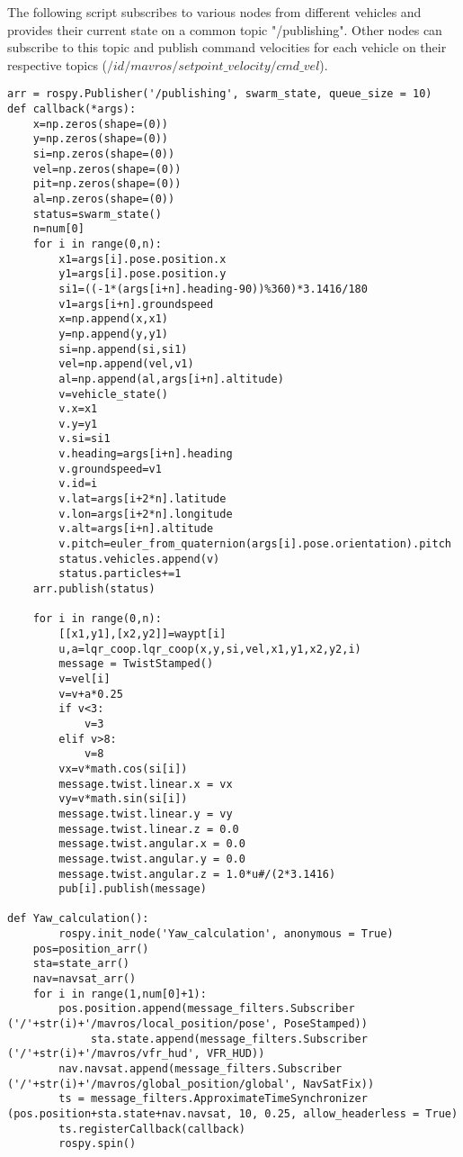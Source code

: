 The following script subscribes to various nodes from different vehicles and provides their current state on a common topic "/publishing". Other nodes can subscribe to this topic and publish command velocities for each vehicle on their respective topics ($/id/mavros/setpoint\_velocity/cmd\_vel$).
\begin{lstlisting}
arr = rospy.Publisher('/publishing', swarm_state, queue_size = 10)
def callback(*args):
	x=np.zeros(shape=(0))
	y=np.zeros(shape=(0))
	si=np.zeros(shape=(0))
	vel=np.zeros(shape=(0))
	pit=np.zeros(shape=(0))
	al=np.zeros(shape=(0))
	status=swarm_state()
	n=num[0]
	for i in range(0,n):	
		x1=args[i].pose.position.x		
		y1=args[i].pose.position.y
		si1=((-1*(args[i+n].heading-90))%360)*3.1416/180
		v1=args[i+n].groundspeed
		x=np.append(x,x1)
		y=np.append(y,y1)
		si=np.append(si,si1)
		vel=np.append(vel,v1)
		al=np.append(al,args[i+n].altitude)
		v=vehicle_state()
		v.x=x1
		v.y=y1
		v.si=si1
		v.heading=args[i+n].heading
		v.groundspeed=v1
		v.id=i
		v.lat=args[i+2*n].latitude
		v.lon=args[i+2*n].longitude
		v.alt=args[i+n].altitude
		v.pitch=euler_from_quaternion(args[i].pose.orientation).pitch
		status.vehicles.append(v)
		status.particles+=1
	arr.publish(status)

	for i in range(0,n):
		[[x1,y1],[x2,y2]]=waypt[i]
		u,a=lqr_coop.lqr_coop(x,y,si,vel,x1,y1,x2,y2,i)
		message = TwistStamped()
		v=vel[i]
		v=v+a*0.25
		if v<3:
			v=3
		elif v>8:
			v=8	
		vx=v*math.cos(si[i])
		message.twist.linear.x = vx
		vy=v*math.sin(si[i])
		message.twist.linear.y = vy
		message.twist.linear.z = 0.0
		message.twist.angular.x = 0.0
		message.twist.angular.y = 0.0
		message.twist.angular.z = 1.0*u#/(2*3.1416)
		pub[i].publish(message)

def Yaw_calculation():
        rospy.init_node('Yaw_calculation', anonymous = True)
	pos=position_arr()
	sta=state_arr()
	nav=navsat_arr()
	for i in range(1,num[0]+1):        
		pos.position.append(message_filters.Subscriber ('/'+str(i)+'/mavros/local_position/pose', PoseStamped))
        	 sta.state.append(message_filters.Subscriber ('/'+str(i)+'/mavros/vfr_hud', VFR_HUD))
		nav.navsat.append(message_filters.Subscriber ('/'+str(i)+'/mavros/global_position/global', NavSatFix))
        ts = message_filters.ApproximateTimeSynchronizer (pos.position+sta.state+nav.navsat, 10, 0.25, allow_headerless = True)
        ts.registerCallback(callback)
        rospy.spin()
\end{lstlisting}

